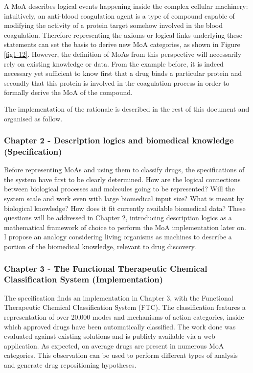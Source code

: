 A MoA describes logical events happening inside the complex cellular machinery: intuitively, an anti-blood coagulation agent is a type of compound capable of modifying the activity of a protein target somehow involved in the blood coagulation. Therefore representing the axioms or logical links underlying these statements can set the basis to derive new MoA categories, as shown in Figure \ref{fig1-12}. However, the definition of MoAs from this perspective will necessarily rely on existing knowledge or data. From the example before, it is indeed necessary yet sufficient to know first that a drug binds a particular protein and secondly that this protein is involved in the coagulation process in order to formally derive the MoA of the compound.

The implementation of the rationale is described in the rest of this document and organised as follow.

\subsubsection{Chapter 2 - Description logics and biomedical knowledge (Specification)}

Before representing MoAs and using them to classify drugs, the specifications of the system have first to be clearly determined. How are the logical connections between biological processes and molecules going to be represented? Will the system scale and work even with large biomedical input size? What is meant by biological knowledge? How does it fit currently available biomedical data? These questions will be addressed in Chapter 2, introducing description logics as a mathematical framework of choice to perform the MoA implementation later on. I propose an analogy considering living organisms as machines to describe a portion of the biomedical knowledge, relevant to drug discovery.

\subsubsection{Chapter 3 - The Functional Therapeutic Chemical Classification System (Implementation)}

The specification finds an implementation in Chapter 3, with the Functional Therapeutic Chemical Classification System (FTC). The classification features a representation of over 20,000 modes and mechanisms of action categories, inside which approved drugs have been automatically classified. The work done was evaluated against existing solutions and is publicly available via a web application. As expected, on average drugs are present in numerous MoA categories. This observation can be used to perform different types of analysis and generate drug repositioning hypotheses.

